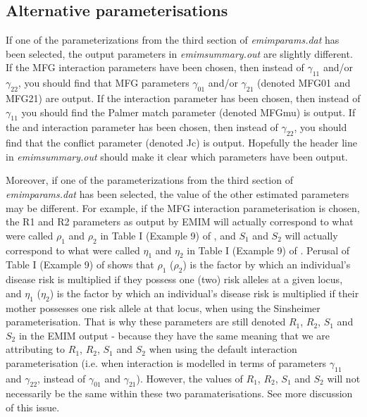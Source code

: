 \documentclass[a4paper,12pt]{article}
\begin{document}
\subsection{Alternative parameterisations}
\label{alt-paras}

If one of the parameterizations from the third section of {\it emimparams.dat} has been selected, the output parameters in {\it emimsummary.out} are slightly different. If the \citet{sinsheimer:etal:03} MFG interaction parameters have been chosen, then instead of $\gamma_{11}$ and/or $\gamma_{22}$, you should find that MFG parameters $\gamma_{01}$ and/or $\gamma_{21}$ (denoted MFG01 and MFG21) are output. If the \citet{palmer:etal:06} interaction parameter has been chosen, then instead of $\gamma_{11}$ you should find the Palmer match parameter (denoted MFGmu) is output. If the \citet{li:etal:09} and \citet{parimi:etal:08} interaction parameter has been chosen, then instead of $\gamma_{22}$, you should find that the \citet{li:etal:09} conflict parameter (denoted Jc) is output. Hopefully the header line in {\it emimsummary.out} should make it clear which parameters have been output. 

Moreover, if one of the parameterizations from the third section of {\it emimparams.dat} has been selected, the value of the other estimated parameters may be different. For example, if the \citet{sinsheimer:etal:03} MFG interaction parameterisation is chosen, the R1 and R2 parameters as output by EMIM will actually correspond to what were called $\rho_1$ and $\rho_2$ in Table I (Example 9) of \citet{ainsworth:etal:11}, and $S_1$ and $S_2$ will actually correspond to what were called $\eta_1$ and $\eta_2$ in Table I (Example 9) of \citet{ainsworth:etal:11}. Perusal of Table I (Example 9) of \citet{ainsworth:etal:11} shows that $\rho_1$ ($\rho_2$) is the factor by which an individual's disease risk is multiplied if they possess one (two) risk alleles at a given locus, and $\eta_1$ ($\eta_2$) is the factor by which an individual's disease risk is multiplied if their mother possesses one risk allele at that locus, when using the Sinsheimer parameterisation. That is why these parameters are still denoted $R_1$, $R_2$, $S_1$ and $S_2$ in the EMIM output - because they have the same meaning that we are attributing to $R_1$, $R_2$, $S_1$ and $S_2$ when using the default interaction parameterisation (i.e. when interaction is modelled in terms of parameters $\gamma_{11}$ and $\gamma_{22}$, instead of $\gamma_{01}$ and $\gamma_{21}$). However, the values of $R_1$, $R_2$, $S_1$ and $S_2$ will not necessarily be the same within these two paramaterisations. See \citet{ainsworth:etal:11} more discussion of this issue. 
\end{document}
